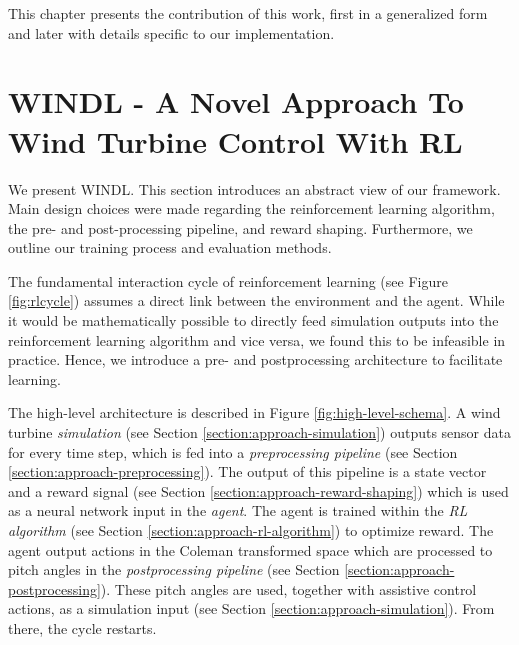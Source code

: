 \label{ch:approach}

This chapter presents the contribution of this work, first in a generalized form and later with details specific to our implementation.

\section{WINDL - A Novel Approach To Wind Turbine Control With RL}
\label{section:approach-theory}

\begin{summary}
We present \acf{WINDL}. This section introduces an abstract view of our framework. Main design choices were made regarding the reinforcement learning algorithm, the pre- and post-processing pipeline, and reward shaping. Furthermore, we outline our training process and evaluation methods.
\end{summary}

The fundamental interaction cycle of reinforcement learning (see Figure \ref{fig:rlcycle}) assumes a direct link between the environment and the agent. While it would be mathematically possible to directly feed simulation outputs into the reinforcement learning algorithm and vice versa, we found this to be infeasible in practice. Hence, we introduce a pre- and postprocessing architecture to facilitate learning.

The high-level architecture is described in Figure \ref{fig:high-level-schema}. A wind turbine \textit{simulation} (see Section \ref{section:approach-simulation}) outputs sensor data for every time step, which is fed into a \textit{preprocessing pipeline} (see Section \ref{section:approach-preprocessing}). The output of this pipeline is a state vector and a reward signal (see Section \ref{section:approach-reward-shaping}) which is used as a neural network input in the \textit{agent}. The agent is trained within the \textit{RL algorithm} (see Section \ref{section:approach-rl-algorithm}) to optimize reward. The agent output actions in the Coleman transformed space which are processed to pitch angles in the \textit{postprocessing pipeline} (see Section \ref{section:approach-postprocessing}). These pitch angles are used, together with assistive control actions, as a simulation input (see Section \ref{section:approach-simulation}). From there, the cycle restarts.

